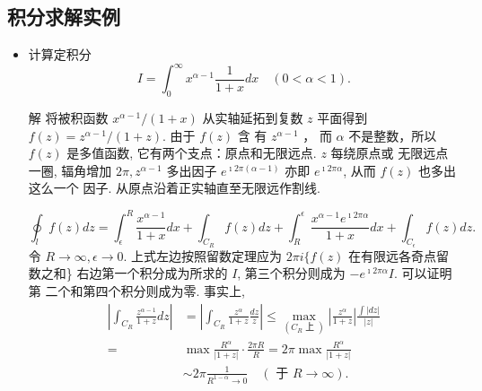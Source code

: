\subsection{积分求解实例}

\begin{itemize}
    \item 计算定积分 
    $$
    I=\int_0^{\infty} x^{\alpha-1} \frac{1}{1+x} d x \quad(0<\alpha<1).
    $$

    解 将被积函数 $x^{\alpha-1} /(1+x)$ 从实轴延拓到复数 $z$ 平面得到 
    $f(z)=z^{\alpha-1} /(1+z)$. 由于 $f(z)$ 含 有 $z^{\alpha-1}$ ，
    而 $\alpha$ 不是整数，所以 $f(z)$ 是多值函数, 它有两个支点：原点和无限远点. 
    $z$ 每绕原点或 无限远点一圈, 辐角增加 $2 \pi, z^{\alpha-1}$ 多出因子 
    $e^{\imath 2 \pi(\alpha-1)}$ 亦即 $e^{\imath 2 \pi \alpha}$,
     从而 $f(z)$ 也多出这么一个 因子.
    从原点沿着正实轴直至无限远作割线.   
    
    $$
\oint_l f(z) d z=\int_{\epsilon}^R \frac{x^{\alpha-1}}{1+x} d x+\int_{C_R} f(z) d z+\int_R^{\epsilon} \frac{x^{\alpha-1} e^{\imath 2 \pi \alpha}}{1+x} d x+\int_{C_{\epsilon}} f(z) d z .
$$
令 $R \rightarrow \infty, \epsilon \rightarrow 0$.
 上式左边按照留数定理应为 $2 \pi i\{f(z)$ 在有限远各奇点留数之和\}
  右边第一个积分成为所求的 $I$, 第三个积分则成为 $-e^{\imath 2 \pi \alpha} I$. 
  可以证明第 二个和第四个积分则成为零. 事实上,
  $$
\begin{aligned}
\left|\int_{C_R} \frac{z^{\alpha-1}}{1+z} d z\right| & =\left|\int_{C_R} \frac{z^\alpha}{1+z} \frac{d z}{z}\right| \leqslant \max _{\left(C_R \text { 上 }\right)}\left|\frac{z^\alpha}{1+z}\right| \frac{\int|d z|}{|z|} \\
= & \max \frac{R^\alpha}{|1+z|} \cdot \frac{2 \pi R}{R}=2 \pi \max \frac{R^\alpha}{|1+z|} \\
& \sim 2 \pi \frac{1}{R^{1-\alpha} \rightarrow 0} \quad(\text { 于 } R \rightarrow \infty) .
\end{aligned}
$$


\end{itemize}
